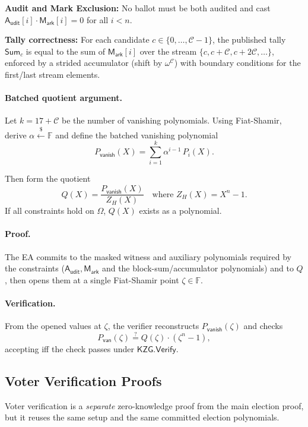 \documentclass{llncs}
\begin{document}
\noindent\textbf{Audit and Mark Exclusion:}
No ballot must be both audited and cast $\mathsf{A_{udit}}[i]\cdot \mathsf{M_{ark}}[i]=0$ for all $i < n$.

\noindent\textbf{Tally correctness:}
For each candidate $c\in\{0,\dots,\mathcal{C}-1\}$, the published tally $\mathsf{Sum}_c$ is equal to the sum of $\mathsf{M_{ark}}[i]$ over the
stream $\{c, c+\mathcal{C}, c+2\mathcal{C},\dots\}$, enforced by a strided accumulator (shift by $\omega^\mathcal{C}$) with boundary conditions
for the first/last stream elements.

\paragraph{Batched quotient argument.}
Let $k=17+\mathcal{C}$ be the number of vanishing polynomials. 
Using Fiat-Shamir, derive $\alpha \stackrel{\$}{\leftarrow} \mathbb{F}$ and define the batched vanishing polynomial
\begin{equation*}
P_{\mathsf{vanish}}(X)=\sum_{i=1}^{k}\alpha^{i-1}\,P_i(X).
\end{equation*}

Then form the quotient
\[
Q(X)=\frac{P_{\mathsf{vanish}}(X)}{Z_H(X)} \quad \text{where } Z_H(X)=X^n-1.
\]
If all constraints hold on $\Omega$, $Q(X)$ exists as a polynomial.  

\paragraph{Proof.}
The EA commits to the masked witness and auxiliary polynomials required by the constraints
($\mathsf{A_{udit}},\mathsf{M_{ark}}$ and the block-sum/accumulator polynomials) and to $Q$,
then opens them at a single Fiat-Shamir point $\zeta\in\mathbb{F}$.  

\paragraph{Verification.}
From the opened values at $\zeta$, the verifier reconstructs $P_{\mathsf{vanish}}(\zeta)$ and checks
\begin{equation*}
P_{\mathsf{van}}(\zeta) \stackrel{?}{=} Q(\zeta)\cdot(\zeta^n-1),
\end{equation*}
accepting iff the check passes under $\mathsf{KZG.Verify}$.  

\subsection{Voter Verification Proofs}
Voter verification is a \emph{separate} zero-knowledge proof from the main election proof, but it reuses the same setup and the same committed election polynomials.  
\end{document}
